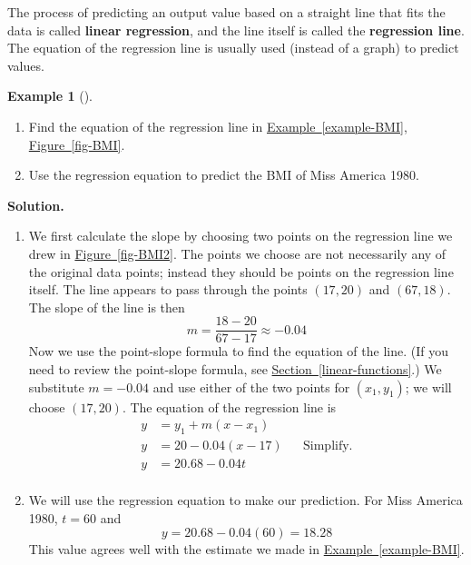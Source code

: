 \documentclass[10pt,]{book}
\newcommand{\terminology}[1]{\textbf{#1}}
\theoremstyle{plain}
\theoremstyle{definition}
\theoremstyle{definition}
\newtheorem{example}[theorem]{Example}
\theoremstyle{definition}
\theoremstyle{definition}
\numberwithin{equation}{section}
\newcommand{\amp}{ & }
\begin{document}
    The process of predicting an output value based on a straight line that fits the data is called \terminology{linear regression}, and the line itself is called the \terminology{regression line}. The equation of the regression line is usually used (instead of a graph) to predict values.%
\begin{example}[]\label{example-BMI-regression}
\leavevmode%
\begin{enumerate}[label=*\alph**]
\item\hypertarget{li-203}{}Find the equation of the regression line in \hyperref[example-BMI]{Example~\ref{example-BMI}}, \hyperref[fig-BMI]{Figure~\ref{fig-BMI}}.\item\hypertarget{li-204}{}Use the regression equation to predict the BMI of Miss America 1980.\end{enumerate}
\par\medskip\noindent%
\textbf{Solution.}\quad \leavevmode%
\begin{enumerate}[label=*\alph**]
\item\hypertarget{li-205}{}We first calculate the slope by choosing two points on the regression line we drew in \hyperref[fig-BMI2]{Figure~\ref{fig-BMI2}}. The points we choose are not necessarily any of the original data points; instead they should be points on the regression line itself. The line appears to pass through the points \((17, 20)\) and \((67, 18)\). The slope of the line is then
        \begin{equation*}m = \frac{18 − 20}{67 − 17}\approx −0.04\end{equation*}
        Now we use the point-slope formula to find the equation of the line. (If you need to review the point-slope formula, see \hyperref[linear-functions]{Section~\ref{linear-functions}}.) We substitute \(m = −0.04\) and use either of the two points for \((x_1, y_1)\); we will choose \((17, 20)\). The equation of the regression line is
        \begin{align*}
        y \amp = y_1 + m(x − x_1)\\
        y \amp = 20−0.04(x−17)
        \amp \amp \text{Simplify.}\\
        y \amp = 20.68 − 0.04t\\
        \end{align*}
        \item\hypertarget{li-206}{}We will use the regression equation to make our prediction. For Miss America 1980, \(t = 60\) and 
        \begin{equation*}y = 20.68 − 0.04(60) = 18.28\end{equation*}
        This value agrees well with the estimate we made in \hyperref[example-BMI]{Example~\ref{example-BMI}}.\end{enumerate}
\end{example}
\end{document}
